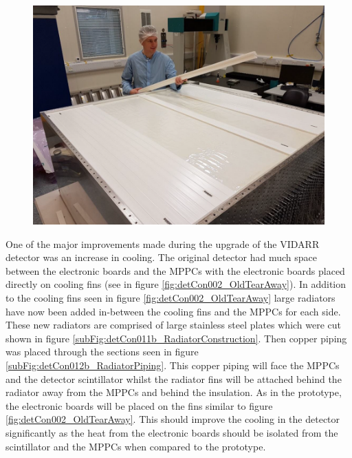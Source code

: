 \begin{figure}[!h]
\centering
\includegraphics[width=0.7\linewidth]{Chapter3/Figs/Raster/detCon006_RonInCleanRoom.png}
\label{fig:detCon006_RonInCleanRoom}
\end{figure}

One of the major improvements made during the upgrade of the VIDARR detector was an increase in cooling. The original detector had much space between the electronic boards and the MPPCs with the electronic boards placed directly on cooling fins (see in figure \ref{fig:detCon002_OldTearAway}). In addition to the cooling fins seen in figure \ref{fig:detCon002_OldTearAway} large radiators have now been added in-between the cooling fins and the MPPCs for each side. These new radiators are comprised of large stainless steel plates which were cut shown in figure \ref{subFig:detCon011b_RadiatorConstruction}. Then copper piping was placed through the sections seen in figure \ref{subFig:detCon012b_RadiatorPiping}. This copper piping will face the MPPCs and the detector scintillator whilst the radiator fins will be attached behind the radiator away from the MPPCs and behind the insulation. As in the prototype, the electronic boards will be placed on the fins similar to figure \ref{fig:detCon002_OldTearAway}. This should improve the cooling in the detector significantly as the heat from the electronic boards should be isolated from the scintillator and the MPPCs when compared to the prototype. 

